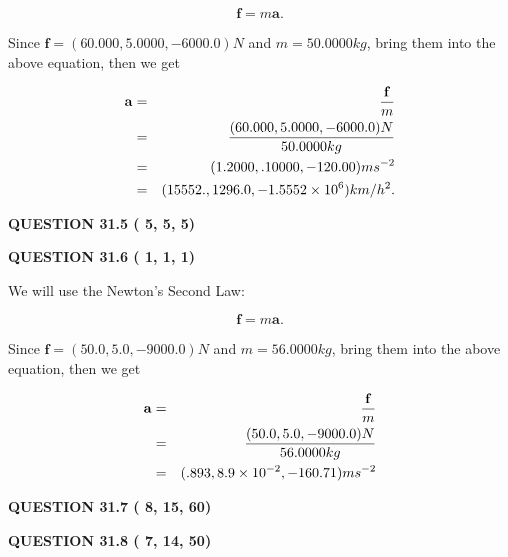 \documentclass[12pt]{article}
\begin{document}
\[
\mathbf{f}=m\mathbf{a}.
\]
 
Since $\mathbf{f}=( %
60.000,  %
5.0000,  %
-6000.0 )N$
and $m= %
50.0000kg$, bring them into the above equation, then we get
 
\begin{eqnarray*}
\mathbf{a}&=&\frac{\mathbf{f}}m  \\
&=&\frac{(
60.000 ,
5.0000 ,
-6000.0 )N
}{ %
50.0000 kg}  \\
&=&(
1.2000 ,
.10000,
-120.00
)ms^{-2} \\
&=&(
15552. ,
1296.0 ,
-1.5552 \times 10^{6}
)km/h^2.
\end{eqnarray*}
 
 
 
  
\vspace{0.2in}
  
{\textbf{\Large{QUESTION
31.5 
 (          5,          5,          5)
}}}
  
  
  
\vspace{0.2in}
  
{\textbf{\Large{QUESTION
31.6 
 (          1,          1,          1)
}}}
  
  


 
 

We will use the Newton's Second Law:
 
\[
\mathbf{f}=m\mathbf{a}.
\]
 
Since $\mathbf{f}= %
(50.0 , 5.0 , -9000.0) N$
and $m= %
56.0000kg$, bring them into the above equation, then we get
 
\begin{eqnarray*}
\mathbf{a}&=&\frac{\mathbf{f}}m  \\
&=&\frac{ %
(50.0 , 5.0 , -9000.0) N}{ %
56.0000kg}  \\
&=& %
(.893 , 8.9 \times 10^{-2} , -160.71) ms^{-2}
\end{eqnarray*}
 
 
 
  
\vspace{0.2in}
  
{\textbf{\Large{QUESTION
31.7 
 (          8,         15,         60)
}}}
  
  
 
 

 
 
  
\vspace{0.2in}
  
{\textbf{\Large{QUESTION
31.8 
 (          7,         14,         50)
}}}
  
\end{document}
